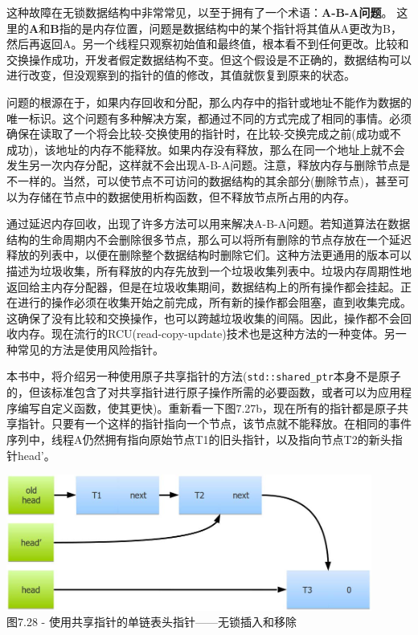 这种故障在无锁数据结构中非常常见，以至于拥有了一个术语：\textbf{A-B-A问题}。 这里的\textbf{A}和\textbf{B}指的是内存位置，问题是数据结构中的某个指针将其值从A更改为B，然后再返回A。另一个线程只观察初始值和最终值，根本看不到任何更改。比较和交换操作成功，开发者假定数据结构不变。但这个假设是不正确的，数据结构可以进行改变，但没观察到的指针的值的修改，其值就恢复到原来的状态。

问题的根源在于，如果内存回收和分配，那么内存中的指针或地址不能作为数据的唯一标识。这个问题有多种解决方案，都通过不同的方式完成了相同的事情。必须确保在读取了一个将会比较-交换使用的指针时，在比较-交换完成之前(成功或不成功)，该地址的内存不能释放。如果内存没有释放，那么在同一个地址上就不会发生另一次内存分配，这样就不会出现A-B-A问题。注意，释放内存与删除节点是不一样的。当然，可以使节点不可访问的数据结构的其余部分(删除节点)，甚至可以为存储在节点中的数据使用析构函数，但不释放节点所占用的内存。

通过延迟内存回收，出现了许多方法可以用来解决A-B-A问题。若知道算法在数据结构的生命周期内不会删除很多节点，那么可以将所有删除的节点存放在一个延迟释放的列表中，以便在删除整个数据结构时删除它们。这种方法更通用的版本可以描述为垃圾收集，所有释放的内存先放到一个垃圾收集列表中。垃圾内存周期性地返回给主内存分配器，但是在垃圾收集期间，数据结构上的所有操作都会挂起。正在进行的操作必须在收集开始之前完成，所有新的操作都会阻塞，直到收集完成。这确保了没有比较和交换操作，也可以跨越垃圾收集的间隔。因此，操作都不会回收内存。现在流行的RCU(read-copy-update)技术也是这种方法的一种变体。另一种常见的方法是使用风险指针。

本书中，将介绍另一种使用原子共享指针的方法(\texttt{std::shared\_ptr}本身不是原子的，但该标准包含了对共享指针进行原子操作所需的必要函数，或者可以为应用程序编写自定义函数，使其更快)。重新看一下图7.27b，现在所有的指针都是原子共享指针。只要有一个这样的指针指向一个节点，该节点就不能释放。在相同的事件序列中，线程A仍然拥有指向原始节点T1的旧头指针，以及指向节点T2的新头指针head'。

\begin{center}
\includegraphics[width=0.9\textwidth]{content/2/chapter7/images/28.jpg}\\
图7.28 - 使用共享指针的单链表头指针——无锁插入和移除
\end{center}

